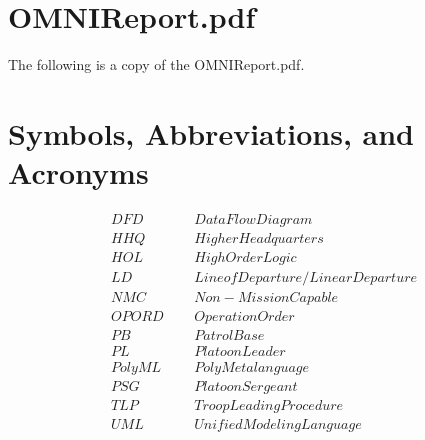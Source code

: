 \chapter{OMNIReport.pdf}
\label{cha:omnireport.pdf}
The following is a copy of the \hypertarget{OMNIReport}{OMNIReport.pdf}.
%

\chapter{Symbols, Abbreviations, and Acronyms}
\label{cha:symb-abbr-acronyms}

\begin{align*}
&DFD\;\;\;\;\;&Data Flow Diagram\ \\
&HHQ\;\;\;\;\;&Higher Headquarters\ \\ 
&HOL\;\;\;\;\;&High Order Logic\ \\
&LD\;\;\;\;\;&Line of Departure/Linear Departure\ \\
&NMC\;\;\;\;\;&Non-Mission Capable\ \\
&OPORD\;\;\;\;\;&Operation Order\ \\
&PB\;\;\;\;\;&Patrol Base\ \\
&PL\;\;\;\;\;&Platoon Leader\ \\
&PolyML\;\;\;\;\;&Poly Metalanguage\ \\
&PSG\;\;\;\;\;&Platoon Sergeant\ \\
&TLP\;\;\;\;\;&Troop Leading Procedure\ \\
&UML\;\;\;\;\;&Unified Modeling Language\ \\
\end{align*}

